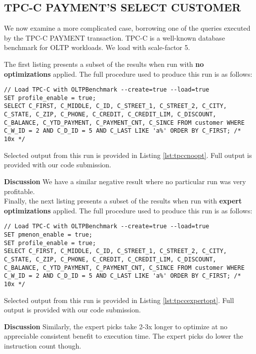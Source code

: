 \documentclass{vldb}
\begin{document}
\subsection{TPC-C PAYMENT'S SELECT CUSTOMER}

We now examine a more complicated case, borrowing one of the queries executed by the TPC-C \cite{tpcc} PAYMENT transaction. TPC-C is a well-known database benchmark for OLTP workloads. We load with scale-factor 5.

The first listing presents a subset of the results when run with \textbf{no optimizations} applied. The full procedure used to produce this run is as follows:
\begin{lstlisting}
// Load TPC-C with OLTPBenchmark --create=true --load=true
SET profile_enable = true;
SELECT C_FIRST, C_MIDDLE, C_ID, C_STREET_1, C_STREET_2, C_CITY, C_STATE, C_ZIP, C_PHONE, C_CREDIT, C_CREDIT_LIM, C_DISCOUNT, C_BALANCE, C_YTD_PAYMENT, C_PAYMENT_CNT, C_SINCE FROM customer WHERE C_W_ID = 2 AND C_D_ID = 5 AND C_LAST LIKE 'a%' ORDER BY C_FIRST; /* 10x */
\end{lstlisting}

Selected output from this run is provided in Listing \ref{lst:tpccnoopt}. Full output is provided with our code submission.

\textbf{Discussion} We have a similar negative result where no particular run was very profitable. \\

Finally, the next listing presents a subset of the results when run with \textbf{expert optimizations} applied. The full procedure used to produce this run is as follows:
\begin{lstlisting}
// Load TPC-C with OLTPBenchmark --create=true --load=true
SET pmenon_enable = true;
SET profile_enable = true;
SELECT C_FIRST, C_MIDDLE, C_ID, C_STREET_1, C_STREET_2, C_CITY, C_STATE, C_ZIP, C_PHONE, C_CREDIT, C_CREDIT_LIM, C_DISCOUNT, C_BALANCE, C_YTD_PAYMENT, C_PAYMENT_CNT, C_SINCE FROM customer WHERE C_W_ID = 2 AND C_D_ID = 5 AND C_LAST LIKE 'a%' ORDER BY C_FIRST; /* 10x */
\end{lstlisting}

Selected output from this run is provided in Listing \ref{lst:tpccexpertopt}. Full output is provided with our code submission.

\textbf{Discussion} Similarly, the expert picks take 2-3x longer to optimize at no appreciable consistent benefit to execution time. The expert picks do lower the instruction count though.
\end{document}
